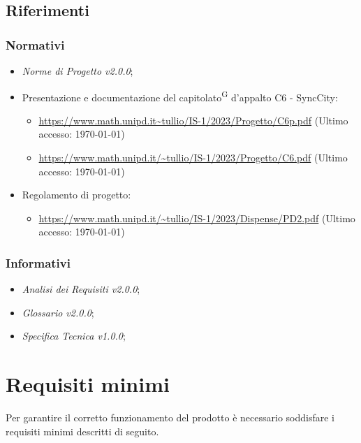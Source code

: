 \documentclass[8pt]{article}
\newcommand{\glossterm}[1]{#1\textsuperscript{G}} %
\begin{document}
\subsection{Riferimenti}
\subsubsection{Normativi}
\begin{itemize}
	\item \textit{Norme di Progetto v2.0.0};
	\item Presentazione e documentazione del \glossterm{capitolato} d’appalto C6 - SyncCity:
	\begin{itemize}
 \setlength\itemsep{0em}
		\item \href{https://www.math.unipd.it/~tullio/IS-1/2023/Progetto/C6p.pdf}{\color{myblue}https://www.math.unipd.it\textasciitilde{}tullio/IS-1/2023/Progetto/C6p.pdf} (Ultimo accesso: \today)
		\item \href{https://www.math.unipd.it/~tullio/IS-1/2023/Progetto/C6.pdf}{\color{myblue}https://www.math.unipd.it/\textasciitilde{}tullio/IS-1/2023/Progetto/C6.pdf} (Ultimo accesso: \today)
	\end{itemize}
	\item Regolamento di progetto:
	\begin{itemize}
		\item \href{https://www.math.unipd.it/~tullio/IS-1/2023/Dispense/PD2.pdf}{\color{myblue}https://www.math.unipd.it/\textasciitilde{}tullio/IS-1/2023/Dispense/PD2.pdf} (Ultimo accesso: \today)
	\end{itemize}
\end{itemize}
\subsubsection{Informativi}
\begin{itemize}
\setlength\itemsep{0em}
    \item \textit{Analisi dei Requisiti v2.0.0};
    \item \textit{Glossario v2.0.0};
    \item \textit{Specifica Tecnica v1.0.0};
\end{itemize}
\clearpage
\section{Requisiti minimi} \label{sec:requirements}
Per garantire il corretto funzionamento del prodotto è necessario soddisfare i requisiti minimi descritti di seguito.
\end{document}
